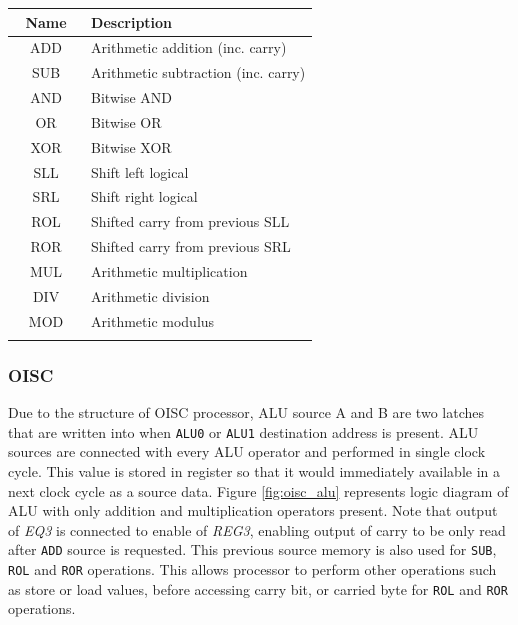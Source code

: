 \begin{blockpage}
	\begin{tabular}{| c | p{0.75\linewidth} |} \hline 
		\rowcolor[rgb]{0.82,0.82,0.82}
		Name & Description \\\hline
		\arrayrulecolor[rgb]{0.82,0.82,0.82}
		ADD & Arithmetic addition (inc. carry) \\\hline
		SUB & Arithmetic subtraction (inc. carry) \\\hline
		AND & Bitwise AND \\\hline
		OR  & Bitwise OR \\\hline
		XOR & Bitwise XOR \\\hline
		SLL & Shift left logical \\\hline
		SRL & Shift right logical \\\hline
		ROL & Shifted carry from previous SLL \\\hline
		ROR & Shifted carry from previous SRL \\\hline
		MUL & Arithmetic multiplication \\\hline
		DIV & Arithmetic division \\\hline
		MOD & Arithmetic modulus \\
		\arrayrulecolor[rgb]{0,0,0}\hline
	\end{tabular}
	\label{tab:alu_set}
\end{blockpage}

\subsubsection{OISC}
Due to the structure of OISC processor, ALU source A and B are two latches that are written into when \texttt{ALU0} or \texttt{ALU1} destination address is present. ALU sources are connected with every ALU operator and performed in single clock cycle. This value is stored in register so that it would immediately available in a next clock cycle as a source data. Figure \ref{fig:oisc_alu} represents logic diagram of ALU with only addition and multiplication operators present. Note that output of \textit{EQ3} is connected to enable of \textit{REG3}, enabling output of carry to be only read after \texttt{ADD} source is requested. This previous source memory is also used for \texttt{SUB}, \texttt{ROL} and \texttt{ROR} operations. This allows processor to perform other operations such as store or load values, before accessing carry bit, or carried byte for \texttt{ROL} and \texttt{ROR} operations.

